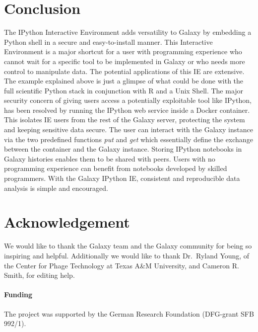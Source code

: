 \documentclass{bioinfo}
\begin{document}
\section{Conclusion}
The IPython Interactive Environment adds versatility to Galaxy by embedding a Python shell in a secure and easy-to-install manner.
This Interactive Environment is a major shortcut for a user with programming experience who cannot wait for a specific tool to
be implemented in Galaxy or who needs more control to manipulate data. The potential applications of this IE are extensive.
The example explained above is just a glimpse of what could be done with the full scientific Python stack in conjunction with R and a Unix Shell.
The major security concern of giving users access a potentially exploitable tool like IPython, 
has been resolved by running the IPython web service inside a Docker container. This 
isolates IE users from the rest of the Galaxy server, protecting the system and keeping sensitive data secure.
The user can interact with the Galaxy instance via the two predefined functions \textit{put} and \textit{get} 
which essentially define the exchange between the container and the Galaxy instance.
Storing IPython notebooks in Galaxy histories enables them to be shared with peers. 
Users with no programming experience can benefit from notebooks developed by skilled programmers.
With the Galaxy IPython IE, consistent and reproducible data analysis is simple and encouraged. 


\section*{Acknowledgement}
We would like to thank the Galaxy team and the Galaxy community for being so inspiring and helpful. 
Additionally we would like to thank Dr.~Ryland Young, of the Center for Phage Technology at Texas A\&M University, 
and Cameron R. Smith, for editing help.

\paragraph{Funding\textcolon} The project was supported by the German Research Foundation (DFG-grant SFB 992/1).


%
%
%
%
%
%
%
%
\end{document}
